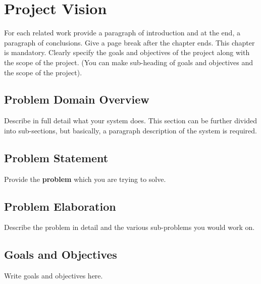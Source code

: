 \chapter{Project Vision}
For each related work provide a paragraph of introduction and at the end, a paragraph of conclusions. Give a page break after the chapter ends.  This chapter is mandatory.  
Clearly specify the goals and objectives of the project along with the scope of the project. (You can make sub-heading of goals and objectives and the scope of the project).
\section{Problem Domain Overview}
Describe in full detail what your system does. This section can be further divided into sub-sections, but basically, a paragraph description of the system is required.
\section{Problem Statement}
Provide the \textbf{problem} which you are trying to solve. 
\section{Problem Elaboration}
Describe the problem in detail and the various sub-problems you would work on.
\section{Goals and Objectives}
Write goals and objectives here.
